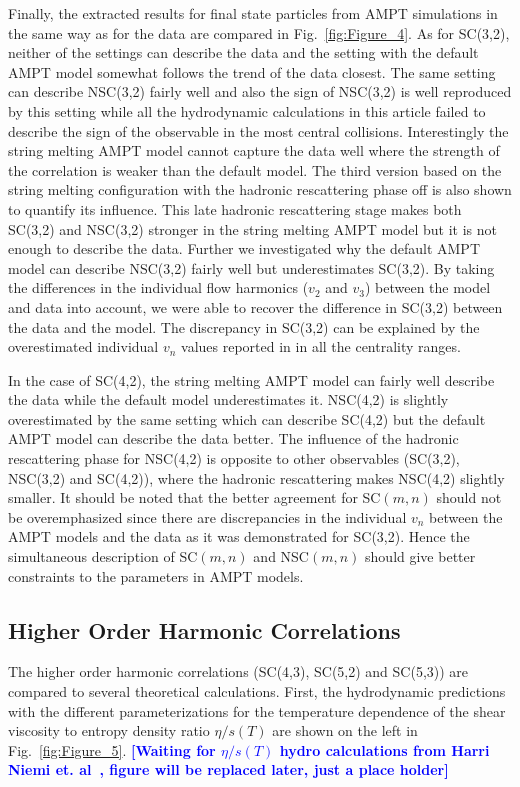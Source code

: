 Finally, the extracted results for final state particles from AMPT simulations in the same way as for the data are compared in Fig.~\ref{fig:Figure_4}.
As for SC(3,2), neither of the settings can describe the data and the setting with the default AMPT model somewhat follows the trend of the data closest. The same setting can describe NSC(3,2) fairly well and also the sign of NSC(3,2) is well reproduced by this setting while all the hydrodynamic calculations in this article failed to describe the sign of the observable in the most central collisions.
Interestingly the string melting AMPT model cannot capture the data well where the strength of the correlation is weaker than the default model.
The third version based on the string melting configuration with the hadronic rescattering phase off is also shown to quantify its influence.
This late hadronic rescattering stage makes both SC(3,2) and NSC(3,2) stronger in the string melting AMPT model but it is not enough to describe the data.
Further we investigated why the default AMPT model can describe NSC(3,2) fairly well but underestimates SC(3,2). By taking the differences in the individual flow harmonics ($v_2$ and $v_3$) between the model and data into account, we were able to recover the difference in SC(3,2) between the data and the model. The discrepancy in SC(3,2) can be explained by the overestimated individual $v_n$ values reported in \cite{Adam:2016nfo} in all the centrality ranges. 

In the case of SC(4,2), the string melting AMPT model can fairly well describe the data while the default model underestimates it.
NSC(4,2) is slightly overestimated by the same setting which can describe SC(4,2) but the default AMPT model can describe the data better.
The influence of the hadronic rescattering phase for NSC(4,2) is opposite to other observables (SC(3,2), NSC(3,2) and SC(4,2)), where the hadronic rescattering makes NSC(4,2) slightly smaller.
It should be noted that the better agreement for SC$(m,n)$ should not be overemphasized since there are discrepancies in the individual $v_n$ between the AMPT models and the data as it was demonstrated for SC(3,2).
Hence the simultaneous description of SC$(m,n)$ and NSC$(m,n)$ should give better constraints to the parameters in AMPT models.

\subsection{Higher Order Harmonic Correlations}
The higher order harmonic correlations (SC(4,3), SC(5,2) and SC(5,3)) are compared to several theoretical calculations. 
First, the hydrodynamic predictions with the different parameterizations for the temperature dependence of the shear viscosity to entropy density ratio $\eta/s(T)$ are shown on the left in Fig.~\ref{fig:Figure_5}. 
\noindent\textbf{\textcolor{blue}{[Waiting for $\eta/s(T)$ hydro calculations from Harri Niemi et. al~\cite{Niemi:2015qia}, figure will be replaced later, just a place holder]}}

